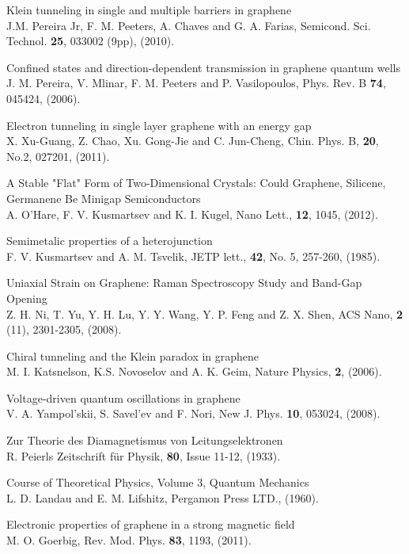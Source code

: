 \documentclass[12pt,a4paper]{report}
\begin{document}
\begin{thebibliography}{10}
 Klein tunneling in single and multiple barriers in graphene\\
J.M. Pereira Jr, F. M. Peeters, A. Chaves and G. A. Farias,
Semicond. Sci. Technol. {\bf 25}, 033002 (9pp), (2010).

 Confined states and direction-dependent transmission in graphene quantum wells\\
J. M. Pereira, V. Mlinar, F. M. Peeters and P. Vasilopoulos,
Phys. Rev. B {\bf 74}, 045424, (2006).

 Electron tunneling in single layer graphene with an energy gap\\
X. Xu-Guang, Z. Chao, Xu. Gong-Jie and C. Jun-Cheng,
Chin. Phys. B, {\bf 20}, No.2, 027201, (2011).

 A Stable "Flat" Form of Two-Dimensional Crystals: Could Graphene, Silicene, Germanene Be Minigap Semiconductors\\
A. O'Hare, F. V. Kusmartsev and K. I. Kugel,
Nano Lett., {\bf 12}, 1045, (2012).

 Semimetalic properties of a heterojunction\\
F. V. Kusmartsev and A. M. Tsvelik,
JETP lett., {\bf 42}, No. 5, 257-260, (1985).

Uniaxial Strain on Graphene: Raman Spectroscopy Study and Band-Gap Opening\\
Z. H. Ni, T. Yu, Y. H. Lu, Y. Y. Wang, Y. P. Feng  and Z. X. Shen,
ACS Nano, {\bf 2} (11), 2301-2305, (2008).

 Chiral tunneling and the Klein paradox in graphene\\
M. I. Katsnelson, K.S. Novoselov and A. K. Geim,
Nature Physics, {\bf 2}, (2006).

	Voltage-driven quantum oscillations in graphene\\
V. A. Yampol'skii, S. Savel'ev and F. Nori,
New J. Phys. {\bf 10}, 053024, (2008).

Zur Theorie des Diamagnetismus von Leitungselektronen\\
R. Peierls
Zeitschrift für Physik, {\bf 80}, Issue 11-12, (1933).

 Course of Theoretical Physics, Volume 3, Quantum Mechanics\\
L. D. Landau and E. M. Lifshitz,
Pergamon Press LTD., (1960).

 Electronic properties of graphene in a strong magnetic field\\
M. O. Goerbig,
Rev. Mod. Phys. {\bf 83}, 1193, (2011).


\end{thebibliography}
\end{document}
